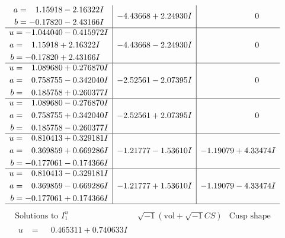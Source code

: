 \documentclass[1p]{elsarticle_modified}
\theoremstyle{definition}
\newcommand{\I}{\sqrt{-1}}
\begin{document}
$$\begin{array}{c|c|c}
\begin{aligned}
a &= \phantom{-}1.15918 - 2.16322 I \\
b &= -0.17820 - 2.43166 I\end{aligned}
 & -4.43668 + 2.24930 I & \phantom{-0.000000 } 0 \\ \hline\begin{aligned}
u &= -1.044040 - 0.415972 I \\
a &= \phantom{-}1.15918 + 2.16322 I \\
b &= -0.17820 + 2.43166 I\end{aligned}
 & -4.43668 - 2.24930 I & \phantom{-0.000000 } 0 \\ \hline\begin{aligned}
u &= \phantom{-}1.089680 + 0.276870 I \\
a &= \phantom{-}0.758755 - 0.342040 I \\
b &= \phantom{-}0.185758 + 0.260377 I\end{aligned}
 & -2.52561 - 2.07395 I & \phantom{-0.000000 } 0 \\ \hline\begin{aligned}
u &= \phantom{-}1.089680 - 0.276870 I \\
a &= \phantom{-}0.758755 + 0.342040 I \\
b &= \phantom{-}0.185758 - 0.260377 I\end{aligned}
 & -2.52561 + 2.07395 I & \phantom{-0.000000 } 0 \\ \hline\begin{aligned}
u &= \phantom{-}0.810413 + 0.329181 I \\
a &= \phantom{-}0.369859 + 0.669286 I \\
b &= -0.177061 - 0.174366 I\end{aligned}
 & -1.21777 - 1.53610 I & -1.19079 + 4.33474 I \\ \hline\begin{aligned}
u &= \phantom{-}0.810413 - 0.329181 I \\
a &= \phantom{-}0.369859 - 0.669286 I \\
b &= -0.177061 + 0.174366 I\end{aligned}
 & -1.21777 + 1.53610 I & -1.19079 - 4.33474 I\\
 \hline 
 \end{array}$$\newpage$$\begin{array}{c|c|c}  
\text{Solutions to }I^u_{1}& \I (\text{vol} + \sqrt{-1}CS) & \text{Cusp shape}\\
 \hline 
\begin{aligned}
u &= \phantom{-}0.465311 + 0.740633 I \\

\end{aligned}
\end{array}$$
\end{document}
